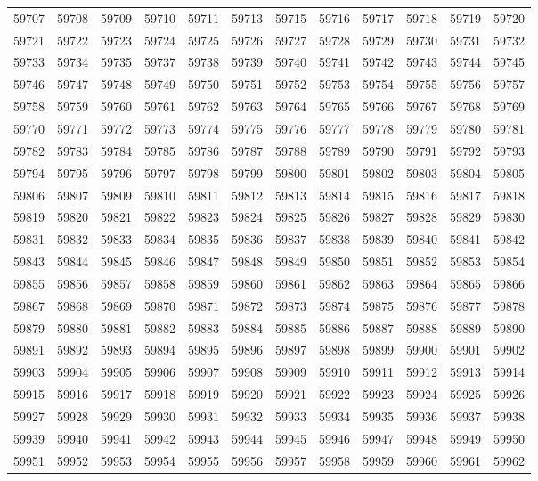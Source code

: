 \begin{center}
\begin{longtable}{llllllllllll}
59707 &59708 &59709 &59710 &59711 &59713 &59715 &59716 &59717 &59718 &59719 &59720 \\
59721 &59722 &59723 &59724 &59725 &59726 &59727 &59728 &59729 &59730 &59731 &59732 \\
59733 &59734 &59735 &59737 &59738 &59739 &59740 &59741 &59742 &59743 &59744 &59745 \\
59746 &59747 &59748 &59749 &59750 &59751 &59752 &59753 &59754 &59755 &59756 &59757 \\
59758 &59759 &59760 &59761 &59762 &59763 &59764 &59765 &59766 &59767 &59768 &59769 \\
59770 &59771 &59772 &59773 &59774 &59775 &59776 &59777 &59778 &59779 &59780 &59781 \\
59782 &59783 &59784 &59785 &59786 &59787 &59788 &59789 &59790 &59791 &59792 &59793 \\
59794 &59795 &59796 &59797 &59798 &59799 &59800 &59801 &59802 &59803 &59804 &59805 \\
59806 &59807 &59809 &59810 &59811 &59812 &59813 &59814 &59815 &59816 &59817 &59818 \\
59819 &59820 &59821 &59822 &59823 &59824 &59825 &59826 &59827 &59828 &59829 &59830 \\
59831 &59832 &59833 &59834 &59835 &59836 &59837 &59838 &59839 &59840 &59841 &59842 \\
59843 &59844 &59845 &59846 &59847 &59848 &59849 &59850 &59851 &59852 &59853 &59854 \\
59855 &59856 &59857 &59858 &59859 &59860 &59861 &59862 &59863 &59864 &59865 &59866 \\
59867 &59868 &59869 &59870 &59871 &59872 &59873 &59874 &59875 &59876 &59877 &59878 \\
59879 &59880 &59881 &59882 &59883 &59884 &59885 &59886 &59887 &59888 &59889 &59890 \\
59891 &59892 &59893 &59894 &59895 &59896 &59897 &59898 &59899 &59900 &59901 &59902 \\
59903 &59904 &59905 &59906 &59907 &59908 &59909 &59910 &59911 &59912 &59913 &59914 \\
59915 &59916 &59917 &59918 &59919 &59920 &59921 &59922 &59923 &59924 &59925 &59926 \\
59927 &59928 &59929 &59930 &59931 &59932 &59933 &59934 &59935 &59936 &59937 &59938 \\
59939 &59940 &59941 &59942 &59943 &59944 &59945 &59946 &59947 &59948 &59949 &59950 \\
59951 &59952 &59953 &59954 &59955 &59956 &59957 &59958 &59959 &59960 &59961 &59962 \\

\end{longtable}
\end{center}
